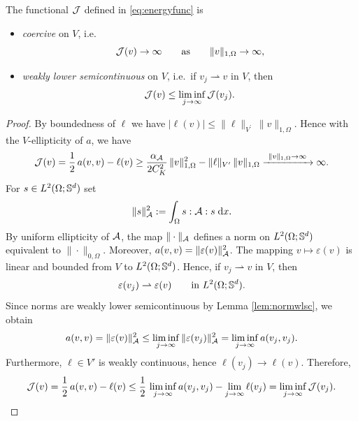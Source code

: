 \begin{lemma}\label{lem:Jcoercivewlsc}
	The functional $\cJ$ defined in \eqref{eq:energyfunc} is
	\begin{itemize}
		\item[i)]{\em coercive} on $V$, i.e.
		      \begin{equation*}
			      \cJ(v)\to\infty\qquad\text{as}\qquad\|v\|_{1,\Omega}\to\infty,
		      \end{equation*}
		\item[ii)] {\em weakly lower semicontinuous} on $V$, i.e.\ if $v_j\rightharpoonup v$ in $V$, then
		      \begin{equation*}
			      \cJ(v)\le \liminf_{j\to\infty}\cJ(v_j).
		      \end{equation*}
	\end{itemize}
\end{lemma}
\begin{proof}
	By boundedness of $\ell$ we have $|\ell(v)|\le \|\ell\|_{V^\prime}\,\|v\|_{1,\Omega}$. Hence with the $V$-ellipticity of $a$, we have
	\begin{equation*}
		\cJ(v)=\frac{1}{2}\,a(v,v)-\ell(v)
		\ge \frac{\alpha_\cA}{2C_K^2}\,\|v\|_{1,\Omega}^2-\|\ell\|_{V^\prime}\,\|v\|_{1,\Omega}
		\xrightarrow{ \ \|v\|_{1,\Omega}\to\infty \ }\infty.
	\end{equation*}
	For $s\in L^2(\Omega;\S^d)$ set
	\begin{equation*}
		\|s\|_\cA^2 := \int_\Omega s:\cA:s\;\dx.
	\end{equation*}
	By uniform ellipticity of $\cA$, the map $\|\cdot\|_\cA$ defines a norm on $L^2(\Omega;\S^d)$
	equivalent to $\|\cdot\|_{0,\Omega}$. Moreover, $a(v,v)=\|\varepsilon(v)\|_\cA^2$.
	The mapping $v\mapsto \varepsilon(v)$ is linear and bounded from $V$ to
	$L^2(\Omega;\S^d)$. Hence, if $v_j\rightharpoonup v$ in $V$, then
	\begin{equation*}
		\varepsilon(v_j)\rightharpoonup \varepsilon(v)
		\qquad\text{in } L^2(\Omega;\S^d).
	\end{equation*}
	Since norms are weakly lower semicontinuous by Lemma \ref{lem:normwlsc}, we obtain
	\begin{equation*}
		a(v,v)=\|\varepsilon(v)\|_\cA^2
		\le \liminf_{j\to\infty}\|\varepsilon(v_j)\|_\cA^2
		= \liminf_{j\to\infty} a(v_j,v_j).
	\end{equation*}
	Furthermore, $\ell\in V'$ is weakly continuous, hence $\ell(v_j)\to \ell(v)$.
	Therefore,
	\begin{equation*}
		\cJ(v)=\frac{1}{2}\,a(v,v)-\ell(v)
		\le \frac{1}{2}\,\liminf_{j\to\infty} a(v_j,v_j) - \lim_{j\to\infty}\ell(v_j)
		= \liminf_{j\to\infty}\cJ(v_j).
	\end{equation*}
\end{proof}


